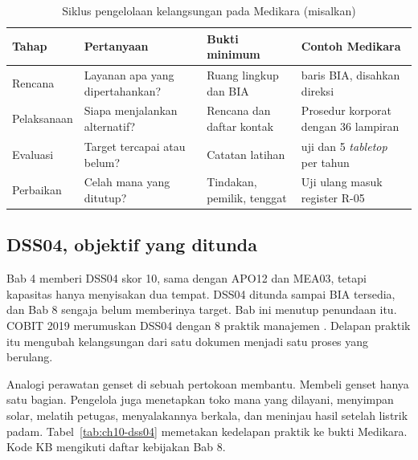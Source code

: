 \begin{table}[!htb]
  \centering\small
  \caption{Siklus pengelolaan kelangsungan pada Medikara (misalkan)}
  \label{tab:ch10-sistem-manajemen}
  \begin{tabularx}{\textwidth}{|>{\raggedright\arraybackslash}p{}|>{\raggedright\arraybackslash}X|>{\raggedright\arraybackslash}X|>{\raggedright\arraybackslash}X|}
    \hline
    \textbf{Tahap} & \textbf{Pertanyaan} & \textbf{Bukti minimum} & \textbf{Contoh Medikara} \\
    \hline
    Rencana & Layanan apa yang dipertahankan? & Ruang lingkup dan BIA & 36 baris BIA, disahkan
    direksi \\ \hline
    Pelaksanaan & Siapa menjalankan alternatif? & Rencana dan daftar kontak & Prosedur korporat
    dengan 36 lampiran \\ \hline
    Evaluasi & Target tercapai atau belum? & Catatan latihan & 144 uji dan 5 \textit{tabletop}
    per tahun \\ \hline
    Perbaikan & Celah mana yang ditutup? & Tindakan, pemilik, tenggat & Uji ulang masuk register
    R-05 \\ \hline
  \end{tabularx}
\end{table}

\subsection*{DSS04, objektif yang ditunda}

Bab 4 memberi DSS04 skor 10, sama dengan APO12 dan MEA03, tetapi kapasitas hanya menyisakan dua
tempat. DSS04 ditunda sampai BIA tersedia, dan Bab 8 sengaja belum memberinya target. Bab ini
menutup penundaan itu. COBIT 2019 merumuskan DSS04 dengan 8 praktik manajemen
\cite{c04-sistematis}. Delapan praktik itu mengubah kelangsungan dari satu dokumen menjadi satu
proses yang berulang.

Analogi perawatan genset di sebuah pertokoan membantu. Membeli genset hanya satu bagian. Pengelola
juga menetapkan toko mana yang dilayani, menyimpan solar, melatih petugas, menyalakannya berkala,
dan meninjau hasil setelah listrik padam. Tabel~\ref{tab:ch10-dss04} memetakan kedelapan praktik
ke bukti Medikara. Kode KB mengikuti daftar kebijakan Bab 8.

